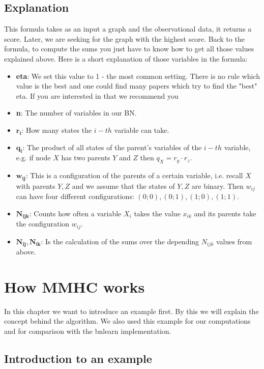 	\section*{Explanation}

		This formula takes as an input a graph and the observational data, it returns a score. Later, we are seeking for the graph with the highest score. Back to the formula, to compute the sums you just have to know how to get all those values explained above. Here is a short explanation of those variables in the formula:

		\begin{itemize}
			\item \textbf{eta}: We set this value to 1 - the most common setting. There is no rule which value is the best and one could find many papers which try to find the "best" eta. If you are interested in that we recommend you \cite{SKM}
			\item \textbf{n}: The number of variables in our BN.
			\item $\boldsymbol{r_{i}}$: How many states the $i-th$ variable can take.
			\item $\boldsymbol{q_{i}}$: The product of all states of the parent's variables of the $i-th$ variable, e.g. if node $X$ has two parents $Y$ and $Z$ then $q_{X} = r_{y} \cdot r_{z}$.
			\item $\boldsymbol{w_{ij}}$: This is a configuration of the parents of a certain variable, i.e. recall $X$ with parents $Y, Z$ and we assume that the states of $Y, Z$ are binary. Then $w_{ij}$ can have four different configurations: $(0; 0), (0; 1), (1; 0), (1; 1)$.
			\item $\boldsymbol{N_{ijk}}$: Counts how often a variable $X_{i}$ takes the value $x_{ik}$ and its parents take the configuration $w_{ij}$.
			\item $\boldsymbol{N_{ij}, N_{ik}}$: Is the calculation of the sums over the depending $N_{ijk}$ values from above.
		\end{itemize}

\chapter{How MMHC works}

	In this chapter we want to introduce an example first. By this we will explain the concept behind the algorithm. We also used this example for our computations and for comparison with the bnlearn implementation.

	\section{Introduction to an example} \label{s.example}

